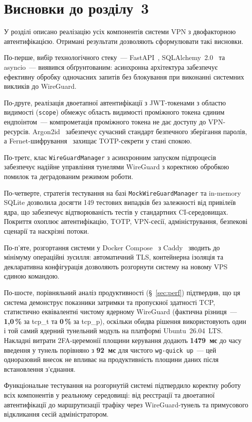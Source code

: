 \section{Висновки до розділу~3}
\label{sec:chapter3_conclusions}

У розділі описано реалізацію усіх компонентів системи VPN з двофакторною
автентифікацією. Отримані результати дозволяють сформулювати такі висновки.

По-перше, вибір технологічного стеку~--- FastAPI~\cite{fastapi2024},
SQLAlchemy~2.0~\cite{sqlalchemy2024} та asyncio~--- виявився обґрунтованим:
асинхронна архітектура забезпечує ефективну обробку одночасних запитів
без блокування при виконанні системних викликів до WireGuard.

По-друге, реалізація двоетапної автентифікації з JWT-токенами з областю
видимості (\texttt{scope}) обмежує область видимості проміжного токена
єдиним ендпоінтом~--- компрометація проміжного токена не дає доступу до
VPN-ресурсів.
Argon2id~\cite{biryukov2016argon2} забезпечує сучасний стандарт
безпечного зберігання паролів, а Fernet-шифрування~\cite{cryptography_fernet}
захищає TOTP-секрети у стані спокою.

По-третє, клас \texttt{WireGuardManager} з асинхронним запуском
підпроцесів забезпечує надійне управління тунелями WireGuard з коректною
обробкою помилок та деградованим режимом роботи.

По-четверте, стратегія тестування на базі \texttt{MockWireGuardManager}
та in-memory SQLite дозволила досягти 149 тестових випадків без залежності
від привілеїв ядра, що забезпечує відтворюваність тестів у стандартних
CI-середовищах. Покриття охоплює автентифікацію, TOTP, VPN-сесії,
адміністрування, безпекові сценарії та наскрізні потоки.

По-п'яте, розгортання системи у Docker Compose~\cite{docker2024} з
Caddy~\cite{caddy2024} зводить до мінімуму операційні зусилля:
автоматичний TLS, контейнерна ізоляція та декларативна конфігурація
дозволяють розгорнути систему на новому VPS єдиною командою.

По-шосте, порівняльний аналіз продуктивності (§~\ref{sec:perf})
підтвердив, що ця система демонструє показники затримки та пропускної
здатності TCP, статистично еквівалентні чистому ядерному WireGuard
(фактична різниця~--- \textbf{1{,}0\,\%} за tcp\_t та \textbf{0\,\%}
за tcp\_p), оскільки обидва рішення використовують один і той самий
ядерний тунельний модуль на платформі Ubuntu~26.04~LTS. Накладні витрати
2FA-церемонії площини керування додають \textbf{1479~мс} до часу введення
у тунель порівняно з \textbf{92~мс} для чистого \texttt{wg-quick up}~---
цей одноразовий внесок не впливає на продуктивність площини даних після
встановлення з'єднання.

Функціональне тестування на розгорнутій системі підтвердило коректну
роботу всіх компонентів у реальному середовищі: від реєстрації та
двоетапної автентифікації до маршрутизації трафіку через WireGuard-тунель
та примусового відкликання сесій адміністратором.

\newpage
